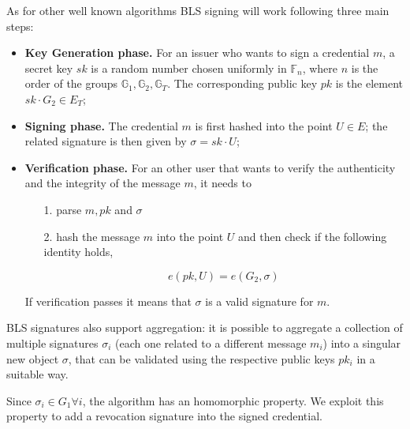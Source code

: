 As for other well known algorithms BLS signing will work following
three main steps:
\begin{itemize}

\item \textbf{Key Generation phase.} For an issuer who wants to sign a
  credential $m$, a secret key $sk$ is a random number chosen
  uniformly in $\mathbb{F}_n$, where $n$ is the order of the groups
  $\mathbb{G}_1, \mathbb{G}_2, \mathbb{G}_T$. The corresponding public
  key $pk$ is the element $sk\cdot G_2\in E_T$;

\item \textbf{Signing phase.} The credential $m$ is first hashed into
  the point $U\in E$; the related signature is then given by $\sigma =
  sk\cdot U$;

\item \textbf{Verification phase.} For an other user that wants to
  verify the authenticity and the integrity of the message $m$, it
  needs to

  \begin{itemize}

  \item [1.] parse $m, pk$ and $\sigma$

  \item [2.] hash the message $m$ into the point $U$ and then
    check if the following identity holds,

    \[
    e(pk,U) = e(G_2,\sigma)
    \]

  \end{itemize}
If verification passes it means that $\sigma$ is a valid signature for
$m$.
\end{itemize}

BLS signatures also support aggregation: it is possible to aggregate a
collection of multiple signatures $\sigma_i$ (each one related to a
different message $m_i$) into a singular new object $\sigma$, that can
be validated using the respective public keys $pk_i$ in a suitable
way.

Since $\sigma_i\in G_1 \forall i$, the algorithm has an homomorphic
property. We exploit this property to add a revocation signature into
the signed credential.

